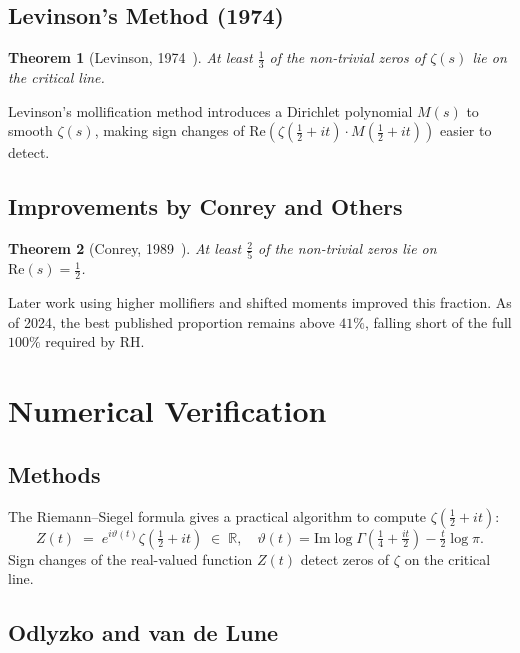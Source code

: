 \documentclass[12pt,a4paper]{article}
\newtheorem{theorem}{Theorem}[section]
\theoremstyle{remark}
\begin{document}
\subsection{Levinson's Method (1974)}

\begin{theorem}[Levinson, 1974~\cite{Levinson1974}]
  At least $\tfrac{1}{3}$ of the non-trivial zeros of $\zeta(s)$ lie on the critical line.
\end{theorem}

Levinson's mollification method introduces a Dirichlet polynomial $M(s)$ to smooth
$\zeta(s)$, making sign changes of $\mathrm{Re}(\zeta(\tfrac{1}{2}+it)\cdot M(\tfrac{1}{2}+it))$
easier to detect.

\subsection{Improvements by Conrey and Others}

\begin{theorem}[Conrey, 1989~\cite{Conrey1989}]
  At least $\tfrac{2}{5}$ of the non-trivial zeros lie on $\mathrm{Re}(s)=\tfrac{1}{2}$.
\end{theorem}

Later work using higher mollifiers and shifted moments improved this fraction.
As of 2024, the best published proportion remains above $41\%$, falling short of the
full $100\%$ required by RH.

\section{Numerical Verification}

\subsection{Methods}

The Riemann--Siegel formula gives a practical algorithm to compute $\zeta(\tfrac{1}{2}+it)$:
\[
  Z(t) \;=\; e^{i\vartheta(t)}\zeta\!\left(\tfrac{1}{2}+it\right) \;\in\;\mathbb{R},
  \quad
  \vartheta(t) = \mathrm{Im}\log\Gamma\!\left(\tfrac{1}{4}+\tfrac{it}{2}\right) - \tfrac{t}{2}\log\pi.
\]
Sign changes of the real-valued function $Z(t)$ detect zeros of $\zeta$ on the critical line.

\subsection{Odlyzko and van de Lune}
\end{document}
